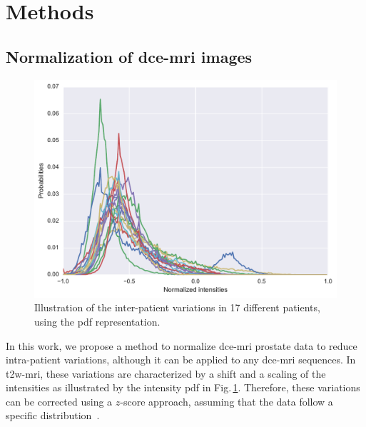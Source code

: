 \section{Methods}\label{sec:method}

\subsection{Normalization of \ac{dce}-\ac{mri} images}\label{sec:norm}

\begin{figure}
  \centering
  \includegraphics[width=0.7\linewidth]{02_methods/figures/t2w.pdf}
  \caption{Illustration of the inter-patient variations in 17 different patients, using the \acs*{pdf} representation.}
  \label{fig:t2w}
\end{figure}

In this work, we propose a method to normalize \ac{dce}-\ac{mri} prostate data to reduce intra-patient variations, although it can be applied to any \ac{dce}-\ac{mri} sequences.
In \ac{t2w}-\ac{mri}, these variations are characterized by a shift and a scaling of the intensities as illustrated by the intensity \ac{pdf} in Fig.\,\ref{fig:t2w}.
Therefore, these variations can be corrected using a $z$-score approach, assuming that the data follow a specific distribution~\citep{lemaitre2016normalization}.

